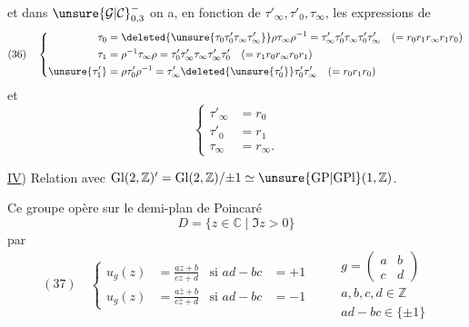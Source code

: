 et dans $\unsure{\mathcal{G}|\mathcal{C}}_{0,3}^{-}$ on a, en fonction de $\tau'_\infty,\tau'_0,\tau_\infty$,
les expressions de 
\[
(36)\quad\left\{\begin{aligned}
\tau_0&=\deleted{\unsure{\tau_0\tau'_0\tau_\infty\tau'_\infty}}\rho\tau_\infty\rho^{-1}
=\tau'_\infty\tau'_0\tau_\infty\tau'_0\tau'_\infty
\quad(=r_0r_1r_\infty r_1r_0)\\
\tau_1&=\rho^{-1}\tau_\infty\rho
=\tau'_0\tau'_\infty\tau_\infty\tau'_\infty\tau'_0
\quad(=r_1r_0r_\infty r_0r_1)\\
\unsure{\tau'_1}&=\rho\tau'_0\rho^{-1}
=\tau'_\infty\deleted{\unsure{\tau'_0}}\tau'_0\tau'_\infty
\quad(=r_0r_1r_0)
\end{aligned}\right.
\]
et
\[
\left\{\begin{aligned}
\tau'_\infty&=r_0\\
\tau'_0&=r_1\\
\tau_\infty&=r_\infty.
\end{aligned}\right.
\]

\uline{IV}) Relation avec
$\mathrm{Gl}(2,\mathbb Z)'=\mathrm{Gl}(2,\mathbb Z)/\mathord{\pm}1
\simeq\unsure{\mathrm{GP}|\mathrm{GPl}}(1,\mathbb Z)$.

Ce groupe opère sur le demi-plan de Poincaré
\[
D=\{z\in\mathbb C\mid\Im z>0\}
\]
par
\[
(37)\quad\left\{\begin{aligned}
u_g(z)&=\frac{az+b}{cz+d}&\text{si }ad-bc&=+1\\
u_g(z)&=\frac{a\bar z+b}{c\bar z+d}&\text{si }ad-bc&=-1
\end{aligned}\right.
\qquad
\begin{gathered}
g=\begin{pmatrix}a&b\\c&d\end{pmatrix}\\
a,b,c,d\in\mathbb Z\\
ad-bc\in\{\pm1\}
\end{gathered}
\]


